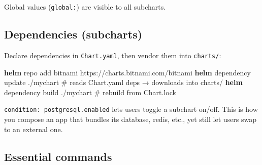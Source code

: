 \documentclass[11pt]{article}
\newenvironment{Shaded}{\begin{snugshade}}{\end{snugshade}}
\newcommand{\CommentTok}[1]{\textcolor[rgb]{0.48,0.49,0.49}{#1}}
\newcommand{\ExtensionTok}[1]{\textcolor[rgb]{0.00,0.60,1.00}{\textbf{#1}}}
\newcommand{\NormalTok}[1]{\textcolor[rgb]{0.81,0.81,0.76}{#1}}
\begin{document}
Global values (\texttt{global:}) are visible to all subcharts.

\subsection{Dependencies (subcharts)}\label{dependencies-subcharts}

Declare dependencies in \texttt{Chart.yaml}, then vendor them into \texttt{charts/}:


\begin{Shaded}
\begin{Highlighting}[]
\ExtensionTok{helm}\NormalTok{ repo add bitnami https://charts.bitnami.com/bitnami}
\ExtensionTok{helm}\NormalTok{ dependency update ./mychart     }\CommentTok{\# reads Chart.yaml deps → downloads into charts/}
\ExtensionTok{helm}\NormalTok{ dependency build  ./mychart     }\CommentTok{\# rebuild from Chart.lock}
\end{Highlighting}
\end{Shaded}

\texttt{condition:\ postgresql.enabled} lets users toggle a subchart on/off. This is how you compose an app that bundles its database, redis, etc., yet still let users swap to an external one.

\subsection{Essential commands}\label{essential-commands}
\end{document}
